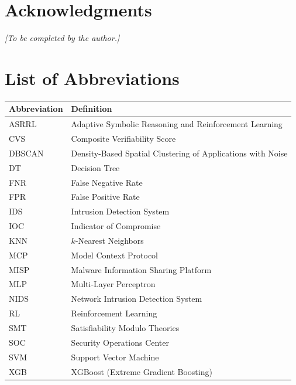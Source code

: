 \documentclass[12pt, letterpaper, oneside]{report}
\begin{document}
\chapter*{Acknowledgments}

\emph{[To be completed by the author.]}

\tableofcontents
\listoffigures
\listoftables
\clearpage

\chapter*{List of Abbreviations}

\begin{tabular}{@{}ll@{}}
\toprule
\textbf{Abbreviation} & \textbf{Definition} \\
\midrule
ASRRL & Adaptive Symbolic Reasoning and Reinforcement Learning \\
CVS & Composite Verifiability Score \\
DBSCAN & Density-Based Spatial Clustering of Applications with Noise \\
DT & Decision Tree \\
FNR & False Negative Rate \\
FPR & False Positive Rate \\
IDS & Intrusion Detection System \\
IOC & Indicator of Compromise \\
KNN & $k$-Nearest Neighbors \\
MCP & Model Context Protocol \\
MISP & Malware Information Sharing Platform \\
MLP & Multi-Layer Perceptron \\
NIDS & Network Intrusion Detection System \\
RL & Reinforcement Learning \\
SMT & Satisfiability Modulo Theories \\
SOC & Security Operations Center \\
SVM & Support Vector Machine \\
XGB & XGBoost (Extreme Gradient Boosting) \\
\bottomrule
\end{tabular}

\setcounter{page}{1}
\end{document}
